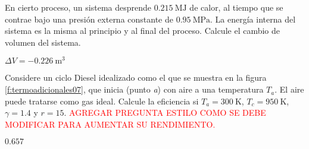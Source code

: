 %
\begin{Exercise}
  En cierto proceso, un sistema desprende $\SI{0.215}{\mega\joule}$ de calor, al tiempo que se contrae bajo una presión externa constante de $\SI{0.95}{\mega\pascal}$. La energía interna del sistema es la misma al principio y al final del proceso. Calcule el cambio de volumen del sistema.
\end{Exercise}
\begin{Answer}
  \begin{minipage}[t]{.4\textwidth}
    $\Delta V = \SI{-0.226}{\cubic\metre}$
  \end{minipage}
\end{Answer}
%
\begin{Exercise}\label{p:termoadicionales07}
  Considere un ciclo Diesel idealizado como el que se muestra en la figura \ref{f:termoadicionales07}, que inicia  (punto \textit{a}) con aire a una temperatura $T_a$. El aire puede tratarse como gas ideal. Calcule la eficiencia si $T_a = \SI{300}{\kelvin}$, $T_c = \SI{950}{\kelvin}$, $\gamma = 1.4$ y $r = 15$. \textcolor{red}{AGREGAR PREGUNTA ESTILO COMO SE DEBE MODIFICAR PARA AUMENTAR SU RENDIMIENTO.}
\end{Exercise}
\begin{Answer}
  \begin{minipage}[t]{.4\textwidth}
    $0.657$
  \end{minipage}
\end{Answer}
%
